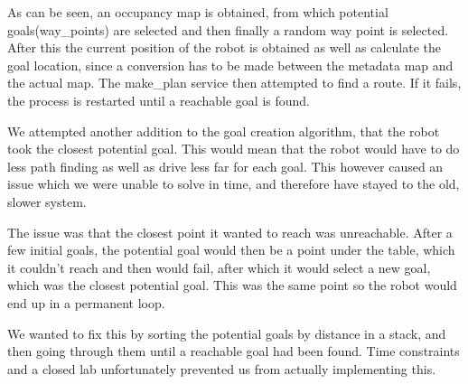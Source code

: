 As can be seen, an occupancy map is obtained, from which potential goals(way\_points) are selected and then finally a random way point is selected. After this the current position of the robot is obtained as well as calculate the goal location, since a conversion has to be made between the metadata map and the actual map. The make\_plan service then attempted to find a route. If it fails, the process is restarted until a reachable goal is found.

We attempted another addition to the goal creation algorithm, that the robot took the closest potential goal. This would mean that the robot would have to do less path finding as well as drive less far for each goal. This however caused an issue which we were unable to solve in time, and therefore have stayed to the old, slower system. 

The issue was that the closest point it wanted to reach was unreachable. After a few initial goals, the potential goal would then be a point under the table, which it couldn't reach and then would fail, after which it would select a new goal, which was the closest potential goal. This was the same point so the robot would end up in a permanent loop.

We wanted to fix this by sorting the potential goals by distance in a stack, and then going through them until a reachable goal had been found. Time constraints and a closed lab unfortunately prevented us from actually implementing this.
